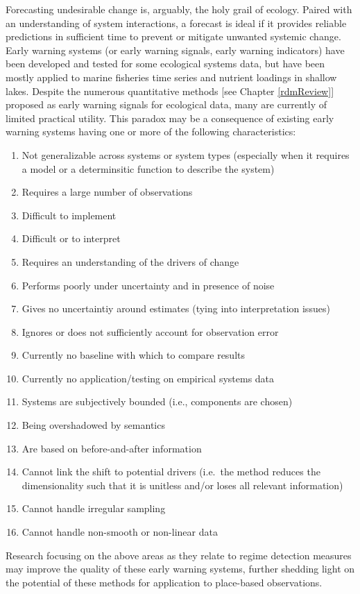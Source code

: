 \documentclass[12pt,twoside,openany]{reedthesis}
\providecommand{\tightlist}{%
  \setlength{\itemsep}{0pt}\setlength{\parskip}{0pt}}
\begin{document}
Forecasting undesirable change is, arguably, the holy grail of ecology. Paired with an understanding of system interactions, a forecast is ideal if it provides reliable predictions in sufficient time to prevent or mitigate unwanted systemic change. Early warning systems (or early warning signals, early warning indicators) have been developed and tested for some ecological systems data, but have been mostly applied to marine fisheries time series and nutrient loadings in shallow lakes. Despite the numerous quantitative methods {[}see Chapter \ref{rdmReview}{]} proposed as early warning signals for ecological data, many are currently of limited practical utility. This paradox may be a consequence of existing early warning systems having one or more of the following characteristics:
\begin{enumerate}
\def\labelenumi{\arabic{enumi}.}
\tightlist
\item
  Not generalizable across systems or system types (especially when it requires a model or a determinsitic function to describe the system)
\item
  Requires a large number of observations
\item
  Difficult to implement
\item
  Difficult or to interpret
\item
  Requires an understanding of the drivers of change
\item
  Performs poorly under uncertainty and in presence of noise
\item
  Gives no uncertaintiy around estimates (tying into interpretation issues)
\item
  Ignores or does not sufficiently account for observation error
\item
  Currently no baseline with which to compare results
\item
  Currently no application/testing on empirical systems data
\item
  Systems are subjectively bounded (i.e., components are chosen)
\item
  Being overshadowed by semantics
\item
  Are based on before-and-after information
\item
  Cannot link the shift to potential drivers (i.e.~the method reduces the dimensionality such that it is unitless and/or loses all relevant information)
\item
  Cannot handle irregular sampling
\item
  Cannot handle non-smooth or non-linear data
\end{enumerate}
Research focusing on the above areas as they relate to regime detection measures may improve the quality of these early warning systems, further shedding light on the potential of these methods for application to place-based observations.
\end{document}
